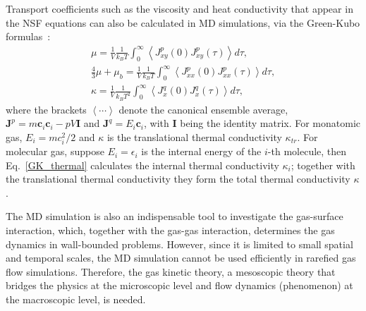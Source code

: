 Transport coefficients such as the viscosity and heat conductivity that appear in the NSF equations can also be calculated in MD simulations, via the Green-Kubo formulas~\cite{Green1954,Kubo1957Japan}: 
\begin{eqnarray}
\mu=\frac{1}{V}\frac{1}{k_BT}\int_0^\infty 
\left\langle J_{xy}^p(0)J_{xy}^p(\tau)  \right\rangle d\tau, \\
\frac{4}{3}\mu+\mu_b=\frac{1}{V}\frac{1}{k_BT}\int_0^\infty 
\left\langle J_{xx}^p(0)J_{xx}^p(\tau)  \right\rangle d\tau,\\
\kappa=\frac{1}{V}\frac{1}{k_BT^2}\int_0^\infty 
\left\langle J_{x}^q(0)J_{x}^q(\tau)  \right\rangle d\tau, \label{GK_thermal}
\end{eqnarray}
where the brackets $\left\langle \cdots \right\rangle$ denote the canonical ensemble average, $\bm{J}^p= m\bm{c}_i\bm{c}_i-pV\bm{I}$ and $\bm{J}^q={E_i}\bm{c}_i$, with $\bm{I}$ being the identity matrix. For monatomic gas, $E_i=mc^2_i/2$ and $\kappa$ is the translational thermal conductivity $\kappa_{tr}$. For molecular gas, suppose $E_i=\epsilon_i$ is the internal energy of the $i$-th molecule, then Eq.~\eqref{GK_thermal} calculates the internal thermal conductivity $\kappa_i$; together with the translational thermal conductivity they form the total thermal conductivity $\kappa$.



The MD simulation is also an indispensable tool to investigate the gas-surface interaction, which, together with the gas-gas interaction, determines the gas dynamics in wall-bounded problems. However, since it is limited to small spatial and temporal scales, the MD simulation cannot be used efficiently in rarefied gas flow simulations. Therefore, the gas kinetic theory, a mesoscopic theory that bridges the physics at the microscopic level and flow dynamics (phenomenon) at the macroscopic level, is needed.  





